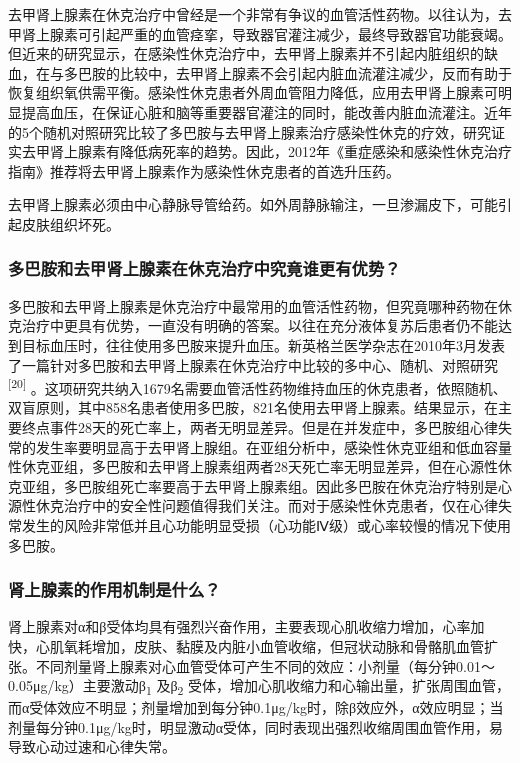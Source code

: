 去甲肾上腺素在休克治疗中曾经是一个非常有争议的血管活性药物。以往认为，去甲肾上腺素可引起严重的血管痉挛，导致器官灌注减少，最终导致器官功能衰竭。但近来的研究显示，在感染性休克治疗中，去甲肾上腺素并不引起内脏组织的缺血，在与多巴胺的比较中，去甲肾上腺素不会引起内脏血流灌注减少，反而有助于恢复组织氧供需平衡。感染性休克患者外周血管阻力降低，应用去甲肾上腺素可明显提高血压，在保证心脏和脑等重要器官灌注的同时，能改善内脏血流灌注。近年的5个随机对照研究比较了多巴胺与去甲肾上腺素治疗感染性休克的疗效，研究证实去甲肾上腺素有降低病死率的趋势。因此，2012年《重症感染和感染性休克治疗指南》推荐将去甲肾上腺素作为感染性休克患者的首选升压药。

去甲肾上腺素必须由中心静脉导管给药。如外周静脉输注，一旦渗漏皮下，可能引起皮肤组织坏死。

\subsubsection{多巴胺和去甲肾上腺素在休克治疗中究竟谁更有优势？}

多巴胺和去甲肾上腺素是休克治疗中最常用的血管活性药物，但究竟哪种药物在休克治疗中更具有优势，一直没有明确的答案。以往在充分液体复苏后患者仍不能达到目标血压时，往往使用多巴胺来提升血压。新英格兰医学杂志在2010年3月发表了一篇针对多巴胺和去甲肾上腺素在休克治疗中比较的多中心、随机、对照研究\textsuperscript{{[}20{]}}
。这项研究共纳入1679名需要血管活性药物维持血压的休克患者，依照随机、双盲原则，其中858名患者使用多巴胺，821名使用去甲肾上腺素。结果显示，在主要终点事件28天的死亡率上，两者无明显差异。但是在并发症中，多巴胺组心律失常的发生率要明显高于去甲肾上腺组。在亚组分析中，感染性休克亚组和低血容量性休克亚组，多巴胺和去甲肾上腺素组两者28天死亡率无明显差异，但在心源性休克亚组，多巴胺组死亡率要高于去甲肾上腺素组。因此多巴胺在休克治疗特别是心源性休克治疗中的安全性问题值得我们关注。而对于感染性休克患者，仅在心律失常发生的风险非常低并且心功能明显受损（心功能Ⅳ级）或心率较慢的情况下使用多巴胺。

\subsubsection{肾上腺素的作用机制是什么？}

肾上腺素对α和β受体均具有强烈兴奋作用，主要表现心肌收缩力增加，心率加快，心肌氧耗增加，皮肤、黏膜及内脏小血管收缩，但冠状动脉和骨骼肌血管扩张。不同剂量肾上腺素对心血管受体可产生不同的效应：小剂量（每分钟0.01～0.05μg/kg）主要激动β\textsubscript{1}
及β\textsubscript{2}
受体，增加心肌收缩力和心输出量，扩张周围血管，而α受体效应不明显；剂量增加到每分钟0.1μg/kg时，除β效应外，α效应明显；当剂量每分钟0.1μg/kg时，明显激动α受体，同时表现出强烈收缩周围血管作用，易导致心动过速和心律失常。

